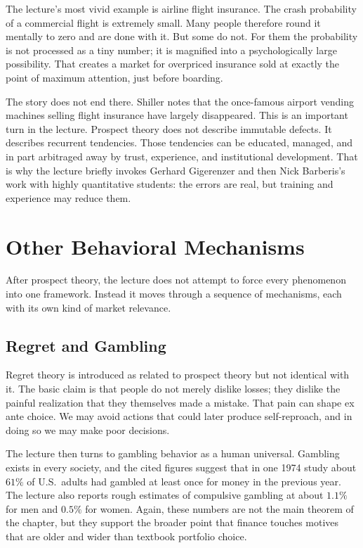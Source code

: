 The lecture's most vivid example is airline flight insurance. The crash probability of a commercial flight is extremely small. Many people therefore round it mentally to zero and are done with it. But some do not. For them the probability is not processed as a tiny number; it is magnified into a psychologically large possibility. That creates a market for overpriced insurance sold at exactly the point of maximum attention, just before boarding.

The story does not end there. Shiller notes that the once-famous airport vending machines selling flight insurance have largely disappeared. This is an important turn in the lecture. Prospect theory does not describe immutable defects. It describes recurrent tendencies. Those tendencies can be educated, managed, and in part arbitraged away by trust, experience, and institutional development. That is why the lecture briefly invokes Gerhard Gigerenzer and then Nick Barberis's work with highly quantitative students: the errors are real, but training and experience may reduce them.

\section{Other Behavioral Mechanisms}

After prospect theory, the lecture does not attempt to force every phenomenon into one framework. Instead it moves through a sequence of mechanisms, each with its own kind of market relevance.

\subsection{Regret and Gambling}

Regret theory is introduced as related to prospect theory but not identical with it. The basic claim is that people do not merely dislike losses; they dislike the painful realization that they themselves made a mistake. That pain can shape ex ante choice. We may avoid actions that could later produce self-reproach, and in doing so we may make poor decisions.

The lecture then turns to gambling behavior as a human universal. Gambling exists in every society, and the cited figures suggest that in one 1974 study about \(61\%\) of U.S.\ adults had gambled at least once for money in the previous year. The lecture also reports rough estimates of compulsive gambling at about \(1.1\%\) for men and \(0.5\%\) for women. Again, these numbers are not the main theorem of the chapter, but they support the broader point that finance touches motives that are older and wider than textbook portfolio choice.

